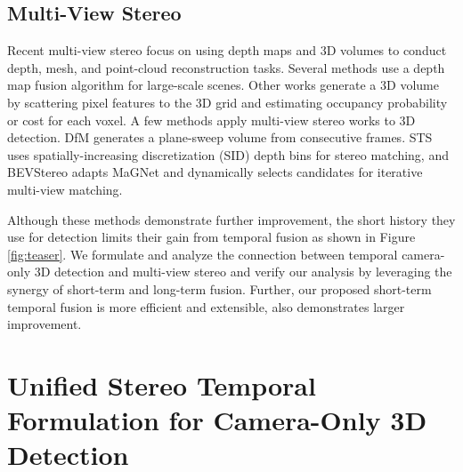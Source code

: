 \documentclass[runningheads, hyperfootnotes=false]{article}
\begin{document}
\subsection{Multi-View Stereo}
Recent multi-view stereo focus on using depth maps \citep{kang2001handling} and 3D volumes \citep{kutulakos2000theory} to conduct depth, mesh, and point-cloud reconstruction tasks. Several methods \citep{galliani2015massively,ji2017surfacenet} use a depth map fusion algorithm for large-scale scenes. Other works \citep{kar2017learning,yao2018mvsnet,yang2020cost,zbontar2016stereo,yao2019recurrent} generate a 3D volume by scattering pixel features to the 3D grid and estimating occupancy probability or cost for each voxel. A few methods apply multi-view stereo works to 3D detection. DfM \citep{wang2022dfm} generates a plane-sweep volume from consecutive frames. STS \citep{wang2022sts} uses spatially-increasing discretization (SID) depth bins \citep{FuCVPR18DORN} for stereo matching, and BEVStereo \citep{li2022bevstereo} adapts MaGNet \citep{Bae2021MultiViewDE} and dynamically selects candidates for iterative multi-view matching. 

Although these methods demonstrate further improvement, the short history they use for detection limits their gain from temporal fusion as shown in Figure \ref{fig:teaser}. We formulate and analyze the connection between temporal camera-only 3D detection and multi-view stereo and verify our analysis by leveraging the synergy of short-term and long-term fusion. Further, our proposed short-term temporal fusion is more efficient and extensible, also demonstrates larger improvement.
 \section{Unified Stereo Temporal Formulation for Camera-Only 3D Detection}\label{sec:formulation}
\end{document}
